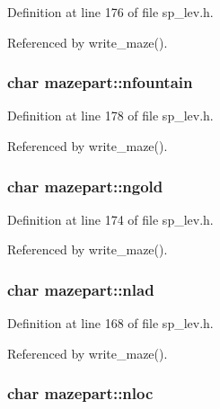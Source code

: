 Definition at line 176 of file sp\+\_\+lev.\+h.



Referenced by write\+\_\+maze().

\hypertarget{structmazepart_a8f959b454330e5b350ff3bdbdc135d36}{
\subsubsection[{nfountain}]{\setlength{\rightskip}{0pt plus 5cm}char mazepart\+::nfountain}}\label{structmazepart_a8f959b454330e5b350ff3bdbdc135d36}


Definition at line 178 of file sp\+\_\+lev.\+h.



Referenced by write\+\_\+maze().

\hypertarget{structmazepart_a8f27a2da143efd35e352cac20a3b075d}{
\subsubsection[{ngold}]{\setlength{\rightskip}{0pt plus 5cm}char mazepart\+::ngold}}\label{structmazepart_a8f27a2da143efd35e352cac20a3b075d}


Definition at line 174 of file sp\+\_\+lev.\+h.



Referenced by write\+\_\+maze().

\hypertarget{structmazepart_a3249719f5288fb209a945b9f758653c3}{
\subsubsection[{nlad}]{\setlength{\rightskip}{0pt plus 5cm}char mazepart\+::nlad}}\label{structmazepart_a3249719f5288fb209a945b9f758653c3}


Definition at line 168 of file sp\+\_\+lev.\+h.



Referenced by write\+\_\+maze().

\hypertarget{structmazepart_a6f22df7eb26d70f56e96a62d23e68383}{
\subsubsection[{nloc}]{\setlength{\rightskip}{0pt plus 5cm}char mazepart\+::nloc}}\label{structmazepart_a6f22df7eb26d70f56e96a62d23e68383}


